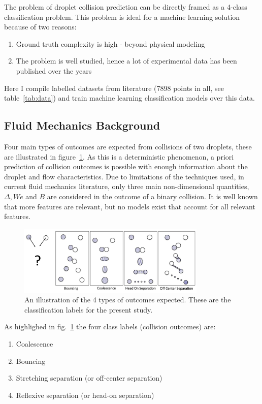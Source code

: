 \documentclass{article}
\begin{document}
The problem of droplet collision prediction can be directly framed as a 4-class classification problem. This problem is ideal for a machine learning solution because of two reasons:
\begin{enumerate}
\item Ground truth complexity is high - beyond physical modeling
\item The problem is well studied, hence a lot of experimental data has been published over the years
\end{enumerate}
Here I compile labelled datasets from literature (7898 points in all, see table~\ref{tab:data}) and train machine learning classification models over this data. 



\subsection{Fluid Mechanics Background}
\label{sec:background}
Four main types of outcomes are expected from collisions of two droplets, these are illustrated in figure~\ref{fig:outcomes}. As this is a deterministic phenomenon, a priori prediction of collision outcomes is possible with enough information about the droplet and flow characteristics. Due to limitations of the techniques used, in current fluid mechanics literature, only three main non-dimensional quantities, $\Delta, We$ and $B$ are considered in the outcome of a binary collision. It is well known that more features are relevant, but no models exist that account for all relevant features.

\begin{figure}[h]
	\centering
	\includegraphics[width=0.8\textwidth]{../figures/outcome-illustration.png}
	\caption{An illustration of the 4 types of outcomes expected. These are the classification labels for the present study.}
	\label{fig:outcomes}
\end{figure}
As highlighed in fig.~\ref{fig:outcomes} the four class labels (collision outcomes) are:
\begin{enumerate}
\item Coalescence
\item Bouncing
\item Stretching separation (or off-center separation)
\item Reflexive separation (or head-on separation)
\end{enumerate}
\end{document}
